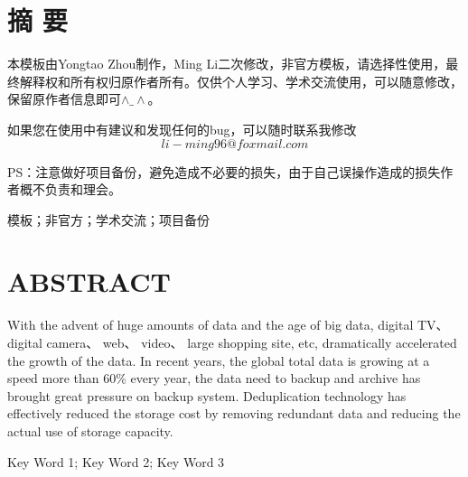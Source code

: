 \frontmatter {}  %

\chapter*{摘\texorpdfstring{\qquad}{} 要}
\thispagestyle{main}

\par 本模板由Yongtao Zhou制作，Ming Li二次修改，非官方模板，请选择性使用，最终解释权和所有权归原作者所有。仅供个人学习、学术交流使用，可以随意修改，保留原作者信息即可$\wedge\_\wedge$。
\par 如果您在使用中有建议和发现任何的bug，可以随时联系我修改
$$li-ming96@foxmail.com$$
\par PS：注意做好项目备份，避免造成不必要的损失，由于自己误操作造成的损失作者概不负责和理会。


\bigskip
{} 模板；非官方；学术交流；项目备份


\chapter*{\bfseries ABSTRACT}
\thispagestyle{main}

\par With the advent of huge amounts of data and the age of big data, digital TV、 digital
camera、 web、 video、 large shopping site, etc, dramatically accelerated the growth of the data. In recent years, the global total data is growing at a speed more than 60\% every year, the data need to backup and archive has brought great pressure on backup system. Deduplication technology has effectively reduced the storage cost by removing redundant data and reducing the actual use of storage capacity.

\bigskip
{}Key Word 1; Key Word 2; Key Word 3
